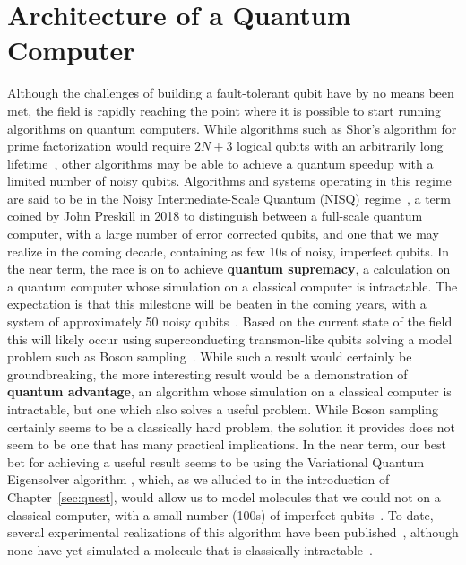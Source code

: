 \chapter{Architecture of a Quantum Computer}
\label{sec:arch}
Although the challenges of building a fault-tolerant qubit have by no means been met, the field is rapidly reaching the point where
it is possible to start running algorithms on quantum computers. While algorithms such as Shor's algorithm for prime factorization
would require $2N + 3$ logical qubits with an arbitrarily long lifetime~\cite{Beauregard:2003,6657074}, other algorithms may
be able to achieve a quantum speedup with a limited number of noisy qubits. Algorithms and systems operating in this regime are
said to be in the Noisy Intermediate-Scale Quantum (NISQ) regime~\cite{Preskill2018quantumcomputingin}, a term coined by John Preskill
in 2018 to distinguish between a full-scale quantum computer, with a large number of error corrected qubits, and one that we may realize
in the coming decade, containing as few 10s of noisy, imperfect qubits. In the near term, the race is on to achieve \textbf{quantum supremacy},
a calculation on a quantum computer whose simulation on a classical computer is intractable. The expectation is that this milestone will
be beaten in the coming years, with a system of approximately 50 noisy qubits~\cite{s41567-018-0124-x}. Based on the current state of the field
this will likely occur using superconducting transmon-like qubits solving a model problem such as Boson sampling~\cite{Aaronson:2011}. While such a
result would certainly be groundbreaking, the more interesting result would be a demonstration of \textbf{quantum advantage}, an algorithm whose simulation on a
classical computer is intractable, but one which also solves a useful problem. While Boson sampling certainly seems to be a classically hard problem,
the solution it provides does not seem to be one that has many practical implications. In the near term, our best bet for achieving a useful result
seems to be using the Variational Quantum Eigensolver algorithm \cite{ncomms5213}, which, as we alluded to in the introduction of Chapter~\ref{sec:quest}, would allow us
to model molecules that we could not on a classical computer, with a small number (100s) of imperfect qubits~\cite{PhysRevA.92.042303}.
To date, several experimental realizations of this algorithm have been published~\cite{nature23879,PhysRevX.8.011021,10.1038/s41586-019-1040-7},
although none have yet simulated a molecule that is classically intractable~\cite{Reiher7555}.

